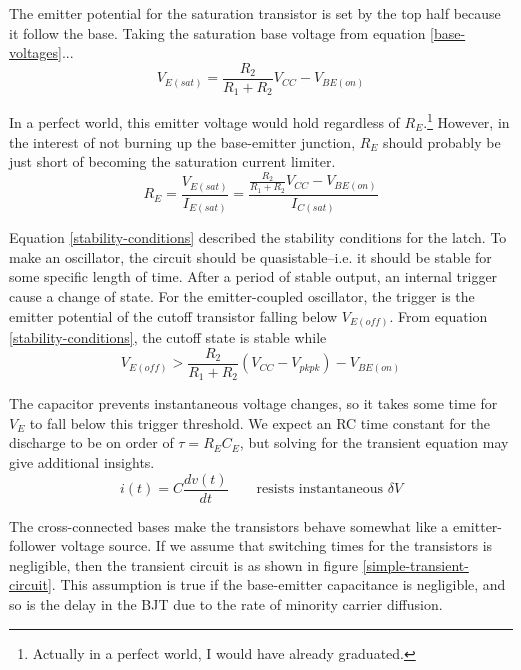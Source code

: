 \documentclass[titlepage, letterpaper, 10.5pt]{article}
\begin{document}
The emitter potential for the saturation transistor is set by the top half because
it follow the base. Taking the saturation base voltage from equation \ref{base-voltages}...
\begin{equation}
V_{E(sat)}=\frac{R_{2}}{R_{1}+R_{2}}V_{CC}-V_{BE(on)}
\label{ve-sat-eq}
\end{equation}

In a perfect world,
this emitter voltage would hold regardless of $R_{E}$.\footnote{Actually in a perfect world, I would have already graduated.}
However, in the interest of not burning up the base-emitter junction, $R_{E}$
should probably be just short of becoming the saturation current limiter.
\begin{equation}
R_{E}=\frac{V_{E(sat)}}{I_{E(sat)}}=\frac{\frac{R_{2}}{R_{1}+R_{2}}V_{CC}-V_{BE(on)}}{I_{C(sat)}}
\label{re-eq}
\end{equation}

Equation \ref{stability-conditions} described the stability conditions for the latch.
To make an oscillator, the circuit should be quasistable--i.e. it should be stable for some
specific length of time. After a period of stable output, an internal trigger cause a change of state.
For the emitter-coupled oscillator, the trigger is the emitter potential of the cutoff transistor
falling below $V_{E(off)}$. From equation \ref{stability-conditions}, the cutoff state is stable while
\begin{equation*}
V_{E(off)}>\frac{R_{2}}{R_{1}+R_{2}}(V_{CC}-V_{pkpk})-V_{BE(on)}
\end{equation*}

The capacitor prevents instantaneous voltage changes, so it takes some time for $V_{E}$
to fall below this trigger threshold. We expect an RC time constant for the discharge to be on
order of $\tau=R_{E}C_{E}$, but solving for the transient equation may give additional insights.
\begin{equation*}
i(t)=C\frac{dv(t)}{dt} \quad \quad \textrm{resists instantaneous } \delta V
\end{equation*}

The cross-connected bases make the transistors behave somewhat like a emitter-follower voltage source.
If we assume that switching times for the transistors is negligible, then the transient circuit
is as shown in figure \ref{simple-transient-circuit}. This assumption is true if the base-emitter
capacitance is negligible, and so is the delay in the BJT due to the rate of minority carrier diffusion.
\end{document}
